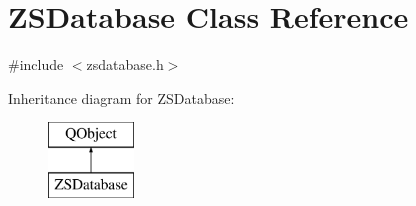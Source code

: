 \hypertarget{class_z_s_database}{\section{Z\-S\-Database Class Reference}
\label{class_z_s_database}
}


{\ttfamily \#include $<$zsdatabase.\-h$>$}

Inheritance diagram for Z\-S\-Database\-:\begin{figure}[H]
\begin{center}
\leavevmode
\includegraphics[height=2.000000cm]{class_z_s_database}
\end{center}
\end{figure}
